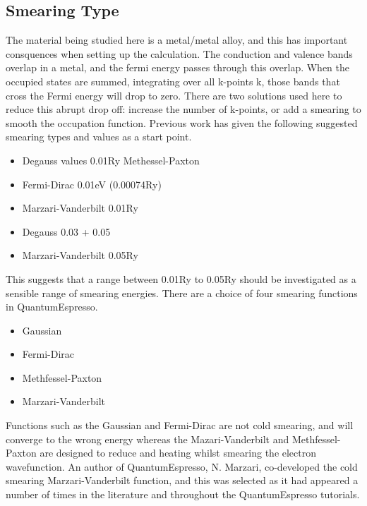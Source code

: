 \subsection{Smearing Type}

The material being studied here is a metal/metal alloy, and this has important consquences when setting up the calculation.  The conduction and valence bands overlap in a metal, and the fermi energy passes through this overlap. When the occupied states are summed, integrating over all k-points k\cite{marzarivanderbilt}, those bands that cross the Fermi energy will drop to zero.  There are two solutions used here to reduce this abrupt drop off: increase the number of k-points, or add a smearing to smooth the occupation function.  Previous work has given the following suggested smearing types and values as a start point.

\begin{itemize}
\item Degauss values 0.01Ry Methessel-Paxton \cite{AdsorptionBR2}
\item Fermi-Dirac 0.01eV (0.00074Ry) \cite{NaDiffusion}
\item Marzari-Vanderbilt 0.01Ry \cite{ScBiandYBi}
\item Degauss 0.03 + 0.05 \cite{CuandPd}
\item Marzari-Vanderbilt 0.05Ry \cite{ecHeuslerAlloy}
\end{itemize}

This suggests that a range between 0.01Ry to 0.05Ry should be investigated as a sensible range of smearing energies.  There are a choice of four smearing functions in QuantumEspresso.

\begin{itemize}
\item Gaussian
\item Fermi-Dirac
\item Methfessel-Paxton
\item Marzari-Vanderbilt
\end{itemize}

Functions such as the Gaussian and Fermi-Dirac are not cold smearing, and will converge to the wrong energy whereas the Mazari-Vanderbilt and Methfessel-Paxton are designed to reduce and heating whilst smearing the electron wavefunction.  An author of QuantumEspresso, N. Marzari, co-developed the cold smearing Marzari-Vanderbilt function, and this was selected as it had appeared a number of times in the literature and throughout the QuantumEspresso tutorials.  






